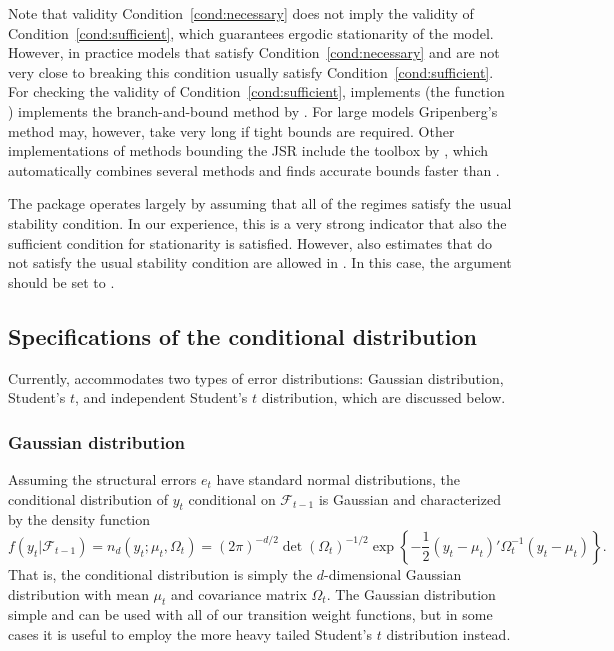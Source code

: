 \documentclass[nojss]{jss}
\begin{document}
Note that validity Condition~\ref{cond:necessary} does not imply the validity of Condition~\ref{cond:sufficient}, which guarantees ergodic stationarity of the model. However, in practice models that satisfy Condition~\ref{cond:necessary} and are not very close to breaking this condition usually satisfy Condition~\ref{cond:sufficient}. For checking the validity of Condition~\ref{cond:sufficient},  implements (the function ) implements the branch-and-bound method by \cite{Gripenberg:1996}. For large models Gripenberg's method may, however, take very long if tight bounds are required. Other implementations of methods bounding the JSR include the  toolbox  by \cite{Jungers:2023}, which automatically combines several methods and finds accurate bounds faster than .

The  package  operates largely by assuming that all of the regimes satisfy the usual stability condition. In our experience, this is a very strong indicator that also the sufficient condition for stationarity is satisfied. However, also estimates that do not satisfy the usual stability condition are allowed in . In this case, the argument  should be set to .


\subsection{Specifications of the conditional distribution}\label{sec:cond_dist}

Currently,  accommodates two types of error distributions: Gaussian distribution, Student's $t$, and independent Student's $t$ distribution, which are discussed below.

\subsubsection{Gaussian distribution}

Assuming the structural errors $e_t$ have standard normal distributions, the conditional distribution of $y_t$ conditional on $\mathcal{F}_{t-1}$ is Gaussian and characterized by the density function
\begin{equation}
f(y_t|\mathcal{F}_{t-1}) = n_d(y_t;\mu_{t},\Omega_{t})=(2\pi)^{-d/2}\det(\Omega_t)^{-1/2}\exp\left\lbrace -\frac{1}{2}(y_t - \mu_t)'\Omega_t^{-1}(y_t - \mu_t) \right\rbrace .
\end{equation}
That is, the conditional distribution is simply the $d$-dimensional Gaussian distribution with mean $\mu_t$ and covariance matrix $\Omega_t$. The Gaussian distribution simple and can be used with all of our transition weight functions, but in some cases it is useful to employ the more heavy tailed Student's $t$ distribution instead.
\end{document}
